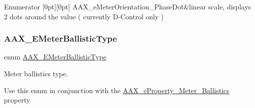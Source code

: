 \begin{DoxyEnumFields}{Enumerator}
[0pt][0pt]{}\mbox{\label{a00491_af260f0f9a6bff0f7bfd3200b2947c96ba243a20e56fa6161e8ba5130c2ca66f6c}} 
A\+A\+X\+\_\+e\+Meter\+Orientation\+\_\+\+Phase\+Dot&linear scale, displays 2 dots around the value ( currently D-\/\+Control only ) \\
\hline

\end{DoxyEnumFields}
\mbox{\label{a00491_a9aaedbe356691c4e4584fa7ccdbcc776}} 
\subsubsection{\texorpdfstring{AAX\_EMeterBallisticType}{AAX\_EMeterBallisticType}}
{\footnotesize\ttfamily enum \mbox{\hyperlink{a00491_a9aaedbe356691c4e4584fa7ccdbcc776}{A\+A\+X\+\_\+\+E\+Meter\+Ballistic\+Type}}}



Meter ballistics type. 

Use this enum in conjunction with the \mbox{\hyperlink{a00662_a13e384f22825afd3db6d68395b79ce0daa8bb492770af0bde7e4ce23184928a63}{A\+A\+X\+\_\+e\+Property\+\_\+\+Meter\+\_\+\+Ballistics}} property

